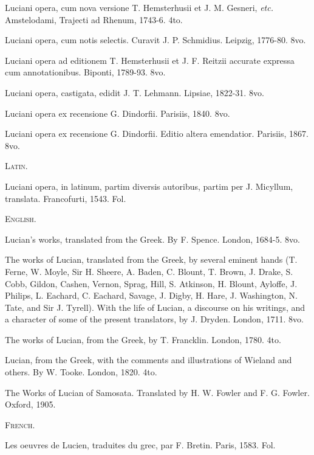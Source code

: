 \documentclass[a4paper, 11pt, oneside, polutonikogreek, english]{article}
\begin{document}
Luciani opera, cum nova versione T. Hemsterhusii et J. M. Gesneri, \emph{etc.} Amstelodami, Trajecti ad Rhenum, 1743-6. 4to.

Luciani opera, cum notis selectis. Curavit J. P. Schmidius. Leipzig, 1776-80. 8vo.

Luciani opera ad editionem T. Hemsterhusii et J. F. Reitzii accurate expressa cum annotationibus. Biponti, 1789-93. 8vo.

Luciani opera, castigata, edidit J. T. Lehmann. Lipsiae, 1822-31. 8vo.

Luciani opera ex recensione G. Dindorfii. Parisiis, 1840. 8vo.

Luciani opera ex recensione G. Dindorfii. Editio altera emendatior. Parisiis, 1867. 8vo.

\begin{center}
\textsc{Latin.}
\end{center}

Luciani opera, in latinum, partim diversis autoribus, partim per J. Micyllum, translata. Francofurti, 1543. Fol.

\begin{center}
\textsc{English.}
\end{center}

Lucian's works, translated from the Greek. By F. Spence. London, 1684-5. 8vo.

The works of Lucian, translated from the Greek, by several eminent hands (T. Ferne, W. Moyle, Sir H. Sheere, A. Baden, C. Blount, T. Brown, J. Drake, S. Cobb, Gildon, Cashen, Vernon, Sprag, Hill, S. Atkinson, H. Blount, Ayloffe, J. Philips, L. Eachard, C. Eachard, Savage, J. Digby, H. Hare, J. Washington, N. Tate, and Sir J. Tyrell). With the life of Lucian, a discourse on his writings, and a character of some of the present translators, by J. Dryden. London, 1711. 8vo.

The works of Lucian, from the Greek, by T. Francklin. London, 1780. 4to.

Lucian, from the Greek, with the comments and illustrations of Wieland and others. By W. Tooke. London, 1820. 4to.

The Works of Lucian of Samosata. Translated by H. W. Fowler and F. G. Fowler. Oxford, 1905.

\begin{center}
\textsc{French.}
\end{center}

Les oeuvres de Lucien, traduites du grec, par F. Bretin. Paris, 1583. Fol.
\end{document}
